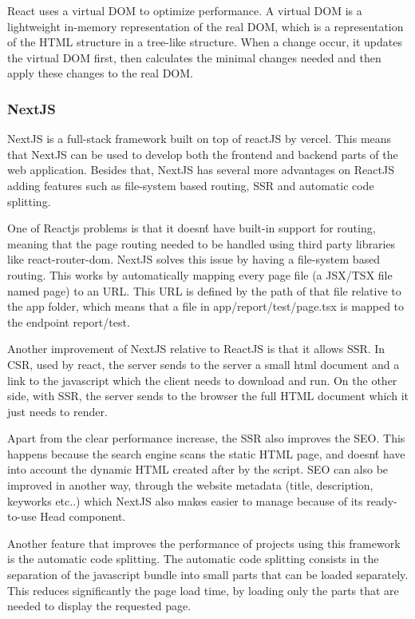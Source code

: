 React uses a virtual \gls{DOM} to optimize performance. A virtual
\gls{DOM} is a lightweight in-memory representation of the real \gls{DOM}, which is a
representation of the \gls{HTML} structure in a tree-like structure. When a change
occur, it updates the virtual \gls{DOM} first, then calculates the minimal changes needed
and then apply these changes to the real \gls{DOM}\cite{bawane2022review}.

\subsubsection{NextJS}
NextJS is a full-stack framework built on top of reactJS by vercel. This means
that NextJS can be used to develop both the frontend and backend parts of the
web application. Besides that, NextJS has several more advantages on ReactJS
adding features such as file-system based routing, \gls{SSR}
and automatic code splitting.

One of Reactjs problems is that it doesn\'t have built-in support for routing,
meaning that the page routing needed to be handled using third party libraries
like react-router-dom. NextJS solves this issue by having a file-system based
routing. This works by automatically mapping every page file (a \gls{JSX}/\gls{TSX}
file named page) to an \gls{URL}. This \gls{URL} is defined by the path of that file
relative to the app folder, which means that a file in app/report/test/page.tsx
is mapped to the endpoint report/test.

Another improvement of NextJS relative to ReactJS is that it allows \gls{SSR}. In
\gls{CSR}, used by react, the server sends to the server a small
html document and a link to the javascript which the client needs to download
and run. On the other side, with \gls{SSR}, the server sends to the browser the
full \gls{HTML} document which it just needs to render\cite{Salanke_A.R_G.S_Dalali_2022}.

Apart from the clear performance increase, the \gls{SSR} also improves the \gls{SEO}.
This happens because the search engine scans the static
\gls{HTML} page, and doesn\'t have into account the dynamic \gls{HTML} created after by
the script. \gls{SEO} can also be improved in another way, through the website
metadata (title, description, keyworks etc..) which NextJS also makes easier to
manage because of its ready-to-use Head component.

Another feature that improves the performance of projects using this framework
is the automatic code splitting. The automatic code splitting consists in
the separation of the javascript bundle into small parts that can be loaded
separately. This reduces significantly the page load time, by loading only the
parts that are needed to display the requested page.


